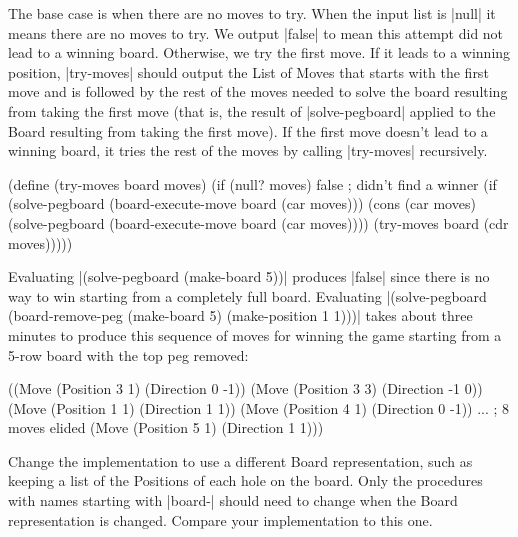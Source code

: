 \begin{schemeregion}
{The base case is when there are no moves to try.  When the input list is \scheme|null| it means there are no moves to try.  We output \scheme|false| to mean this attempt did not lead to a winning board.  Otherwise, we try the first move.  If it leads to a winning position, \scheme|try-moves| should output the List of Moves that starts with the first move and is followed by the rest of the moves needed to solve the board resulting from taking the first move (that is, the result of \scheme|solve-pegboard| applied to the Board resulting from taking the first move).  If the first move doesn't lead to a winning board, it tries the rest of the moves by calling \scheme|try-moves| recursively.
\begin{schemedisplay}
(define (try-moves board moves)
  (if (null? moves)
      false ; didn't find a winner 
      (if (solve-pegboard (board-execute-move board (car moves)))
          (cons (car moves) 
                (solve-pegboard (board-execute-move board (car moves))))
          (try-moves board (cdr moves)))))
\end{schemedisplay}

Evaluating \scheme|(solve-pegboard (make-board 5))| produces \schemeresult|false| since there is no way to win starting from a completely full board.  Evaluating \scheme|(solve-pegboard (board-remove-peg (make-board 5) (make-position 1 1)))| takes about three minutes to produce this sequence of moves for winning the game starting from a 5-row board with the top peg removed:
\begin{schemedisplay}
((Move (Position 3 1) (Direction 0 -1))
 (Move (Position 3 3) (Direction -1 0))
 (Move (Position 1 1) (Direction 1 1))
 (Move (Position 4 1) (Direction 0 -1))
 ... ; 8 moves elided
 (Move (Position 5 1) (Direction 1 1)))
\end{schemedisplay}

\begin{subexerciselist}
\item \goldstar Change the implementation to use a different Board representation, such as keeping a list of the Positions of each hole on the board.  Only the procedures with names starting with \scheme|board-| should need to change when the Board representation is changed.  Compare your implementation to this one.


\end{subexerciselist}}
\end{schemeregion}
